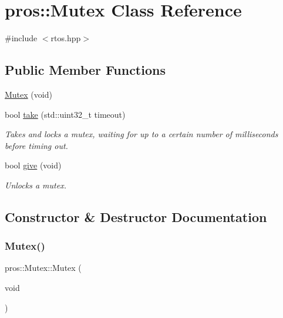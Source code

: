\hypertarget{classpros_1_1Mutex}{}\section{pros\+:\+:Mutex Class Reference}
\label{classpros_1_1Mutex}


{\ttfamily \#include $<$rtos.\+hpp$>$}

\subsection*{Public Member Functions}
\begin{DoxyCompactItemize}
\item 
\hyperlink{classpros_1_1Mutex_a96d568fada90acb8b79d82a3687f8f18}{Mutex} (void)
\item 
bool \hyperlink{classpros_1_1Mutex_a70da733375f7b4b68475881578c78516}{take} (std\+::uint32\+\_\+t timeout)
\begin{DoxyCompactList}\small\item\em Takes and locks a mutex, waiting for up to a certain number of milliseconds before timing out. \end{DoxyCompactList}\item 
bool \hyperlink{classpros_1_1Mutex_a1c3e7ee193608a27a5a509ee7930363b}{give} (void)
\begin{DoxyCompactList}\small\item\em Unlocks a mutex. \end{DoxyCompactList}\end{DoxyCompactItemize}


\subsection{Constructor \& Destructor Documentation}
\mbox{\label{classpros_1_1Mutex_a96d568fada90acb8b79d82a3687f8f18}} 
\subsubsection{\texorpdfstring{Mutex()}{Mutex()}}
{\footnotesize\ttfamily pros\+::\+Mutex\+::\+Mutex (\begin{DoxyParamCaption}\item[{void}]{ }\end{DoxyParamCaption})}



